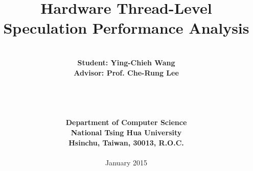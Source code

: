 \documentclass[a4paper,12pt]{report}
\begin{document}

%

\title{\bf \huge Hardware Thread-Level Speculation Performance Analysis}
\date{}
\author{
\begin{tabular}{c}
\\
\\
{\LARGE \bf Student: Ying-Chieh Wang}\\
{\LARGE \bf Advisor: Prof. Che-Rung Lee}\\
\\
\\
\\
\\
{\LARGE \bf Department of Computer Science}\\
{\LARGE \bf National Tsing Hua University}\\
{\LARGE \bf Hsinchu, Taiwan, 30013, R.O.C.}\\
\\
{\large January 2015}
\end{tabular}
}

\maketitle
{}








\setcounter{page}{4}
\tableofcontents
\clearpage
{}
\listoffigures
\clearpage
{}
\listoftables
\clearpage
{}
\listofalgorithms
\clearpage


\setcounter{page}{1}








%
%
\end{document}

